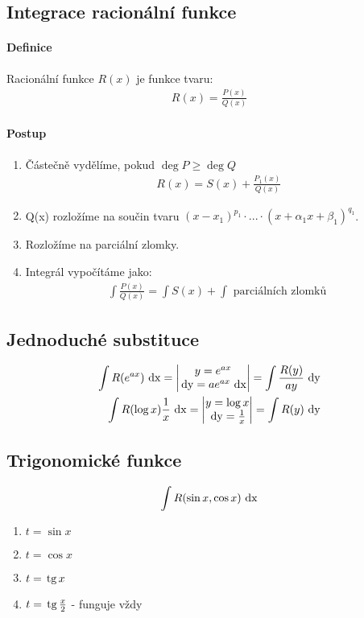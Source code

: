 \documentclass[a4paper,10pt]{article}
\begin{document}
\subsection{Integrace racionální funkce}
\setcounter{equation}{0}
\paragraph{Definice}
Racionální funkce $R(x)$ je funkce tvaru:
\begin{align*}
R(x) = \frac{P(x)}{Q(x)}
\end{align*}
\paragraph{Postup}
\begin{enumerate}
	\item Částečně vydělíme, pokud $\deg P \ge \deg Q$
        \begin{align*}
            R(x) = S(x) + \frac{P_1(x)}{Q(x)}       	
        \end{align*}
 	\item Q(x) rozložíme na součin tvaru $(x-x_1)^{p_1} \cdot ... \cdot (x+\alpha_1x+\beta_1)^{q_1}$.
	\item Rozložíme na parciální zlomky.
	\item Integrál vypočítáme jako:
        \begin{align*}
            \int \frac{P(x)}{Q(x)} = \int S(x) + \int \text{ parciálních zlomků }
        \end{align*}
\end{enumerate}

\subsection{Jednoduché substituce}
\setcounter{equation}{0}
\begin{align}
	\int R(e^{a x}) \operatorname*{\,dx} = \left| 
		\begin{matrix}
			y = e^{ax} \\
			\operatorname*{\,dy} = a e^{ax} \operatorname*{\,dx}
		\end{matrix}
		\right| = \int \frac{R(y)}{ay} \operatorname*{\,dy} \\
	\int R(\log x) \frac{1}{x} \operatorname*{\,dx} = \left| \begin{matrix}y=\log x \\ \operatorname*{\,dy} =
	\frac{1}{x} \end{matrix} \right| = \int R(y) \operatorname*{\,dy}
\end{align}

\subsection{Trigonomické funkce}
\setcounter{equation}{0}
\begin{align*}
	\int R(\sin x, \cos x) \operatorname*{\,dx}
\end{align*}
\begin{enumerate}
	\item  $t = \sin x$
	\item  $t = \cos x$
	\item  $t = \operatorname*{\,tg} x$
	\item  $t = \operatorname*{\,tg} \frac{x}{2}$ - funguje vždy
\end{enumerate} 
\end{document}
